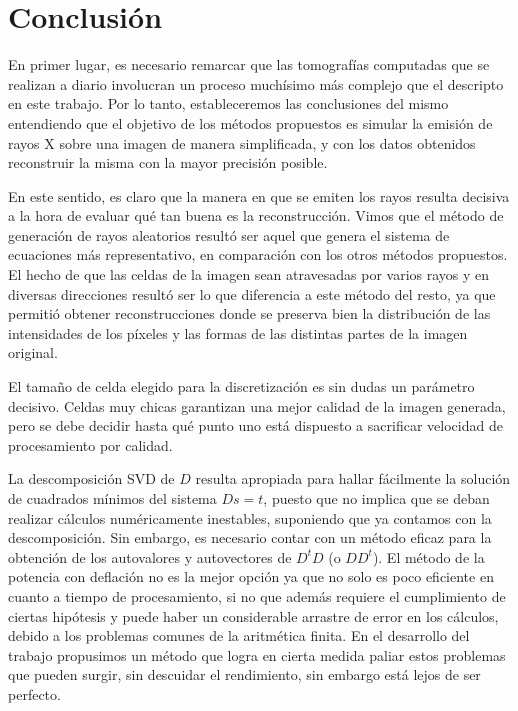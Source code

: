 \documentclass[a4paper]{article}
\begin{document}
\newpage

\section{Conclusión}

En primer lugar, es necesario remarcar que las tomografías computadas que se realizan a diario involucran un proceso muchísimo más complejo que el 
descripto en este trabajo. Por lo tanto, estableceremos las conclusiones del mismo entendiendo que el objetivo de los métodos propuestos es 
simular la emisión de rayos X sobre una imagen de manera simplificada, y con los datos obtenidos reconstruir la misma con la mayor precisión posible. 

En este sentido, es claro que la manera en que se emiten los rayos resulta decisiva a la hora de evaluar qué tan buena es la reconstrucción.
Vimos que el método de generación de rayos aleatorios resultó ser aquel que genera el sistema de ecuaciones más representativo, en comparación con 
los otros métodos propuestos. El hecho de que las celdas de la imagen sean atravesadas por varios rayos y en diversas direcciones resultó ser lo 
que diferencia a este método del resto, ya que permitió obtener reconstrucciones donde se preserva bien la distribución de las intensidades de los 
píxeles y las formas de las distintas partes de la imagen original.

El tamaño de celda elegido para la discretización es sin dudas un parámetro decisivo. Celdas muy chicas garantizan una mejor calidad de la imagen 
generada, pero se debe decidir hasta qué punto uno está dispuesto a sacrificar velocidad de procesamiento por calidad.

La descomposición SVD de $D$ resulta apropiada para hallar fácilmente la solución de cuadrados mínimos del sistema $Ds=t$, puesto que no implica 
que se deban realizar cálculos numéricamente inestables, suponiendo que ya contamos con la descomposición. Sin embargo, es necesario contar con un 
método eficaz para la obtención de los autovalores y autovectores de $D^tD$ (o $DD^t$). El método de la potencia con deflación no es la mejor opción 
ya que no solo es poco eficiente en cuanto a tiempo de procesamiento, si no que además requiere el cumplimiento 
de ciertas hipótesis y puede haber un considerable arrastre de error en los cálculos, debido a los problemas comunes de la aritmética finita.
En el desarrollo del trabajo propusimos un método que logra en cierta medida paliar estos problemas que pueden surgir, sin descuidar el rendimiento, 
sin embargo está lejos de ser perfecto.
\end{document}
